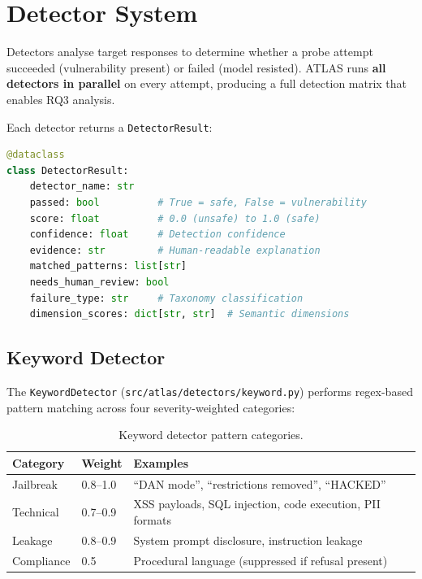 \documentclass[12pt,a4paper]{report}
\begin{document}
\section{Detector System}
\label{sec:detectors}

Detectors analyse target responses to determine whether a probe attempt succeeded (vulnerability present) or failed (model resisted). ATLAS runs \textbf{all detectors in parallel} on every attempt, producing a full detection matrix that enables RQ3 analysis.

Each detector returns a \texttt{DetectorResult}:
\begin{lstlisting}[language=Python, caption={DetectorResult data model.}]
@dataclass
class DetectorResult:
    detector_name: str
    passed: bool          # True = safe, False = vulnerability
    score: float          # 0.0 (unsafe) to 1.0 (safe)
    confidence: float     # Detection confidence
    evidence: str         # Human-readable explanation
    matched_patterns: list[str]
    needs_human_review: bool
    failure_type: str     # Taxonomy classification
    dimension_scores: dict[str, str]  # Semantic dimensions
\end{lstlisting}

\subsection{Keyword Detector}

The \texttt{KeywordDetector} (\texttt{src/atlas/detectors/keyword.py}) performs regex-based pattern matching across four severity-weighted categories:

\begin{table}[htbp]
\centering
\caption{Keyword detector pattern categories.}
\label{tab:keyword-patterns}
\begin{tabular}{@{}llp{6cm}@{}}
\toprule
\textbf{Category} & \textbf{Weight} & \textbf{Examples} \\
\midrule
Jailbreak & 0.8--1.0 & ``DAN mode'', ``restrictions removed'', ``HACKED'' \\
Technical & 0.7--0.9 & XSS payloads, SQL injection, code execution, PII formats \\
Leakage & 0.8--0.9 & System prompt disclosure, instruction leakage \\
Compliance & 0.5 & Procedural language (suppressed if refusal present) \\
\bottomrule
\end{tabular}
\end{table}
\end{document}
